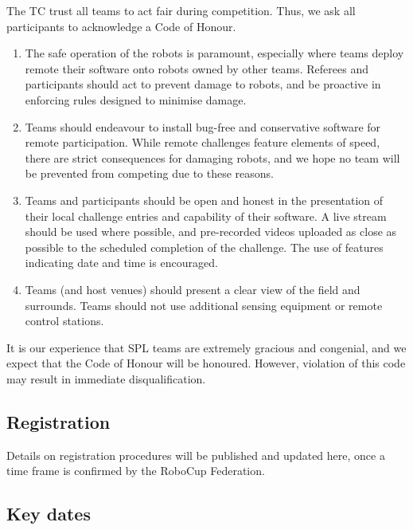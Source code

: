 The TC trust all teams to act fair during competition. Thus, we ask all participants to acknowledge a Code of Honour.
\begin{enumerate}
    \item The safe operation of the robots is paramount, especially where teams deploy remote their software onto robots owned by other teams. Referees and participants should act to prevent damage to robots, and be proactive in enforcing rules  designed to minimise damage.
    \item Teams should endeavour to install bug-free and conservative software for remote participation. While remote challenges feature elements of speed, there are strict consequences for damaging robots, and we hope no team will be prevented from competing due to these reasons.
    \item Teams and participants should be open and honest in the presentation of their local challenge entries and capability of their software.  A live stream should be used where possible, and pre-recorded videos uploaded as close as possible to the scheduled completion of the challenge. The use of features indicating date and time is encouraged.
    \item Teams (and host venues) should present a clear view of the field and surrounds. Teams should not use additional sensing equipment or remote control stations.
\end{enumerate} 

It is our experience that SPL teams are extremely gracious and congenial, and we expect that the Code of Honour will be honoured. However, violation of this code may result in immediate disqualification.

\subsection{Registration}

Details on registration procedures will be published and updated here, once a time frame is confirmed by the RoboCup Federation.

\subsection{Key dates}

